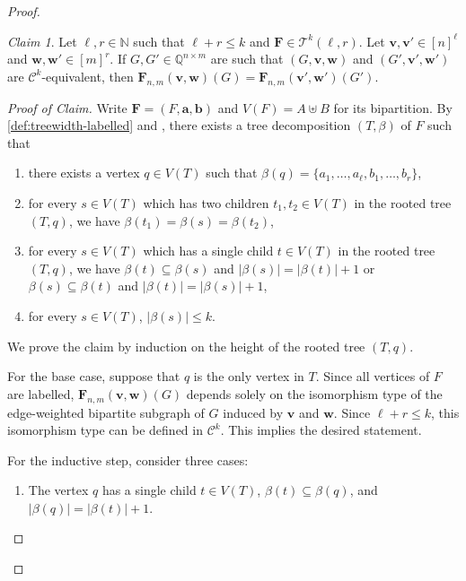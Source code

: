\documentclass[10pt,a4paper]{article}
\theoremstyle{definition}
\theoremstyle{plain}
\theoremstyle{remark}
\newtheorem{claim}{Claim}[definition]
\newenvironment{claimproof}[1][Proof of Claim]{\begin{proof}[#1] \renewcommand{\qedsymbol}{$\lrcorner$}}{ \end{proof}}
\begin{document}
\begin{proof}
		\begin{claim}
			Let $\ell, r \in \mathbb{N}$ such that $\ell +r \leq k$ and $\boldsymbol{F} \in \mathcal{T}^k(\ell, r)$.
			Let $\boldsymbol{v},\boldsymbol{v}' \in [n]^\ell$ and $\boldsymbol{w},\boldsymbol{w}' \in [m]^r$. 
			If $G, G' \in \mathbb{Q}^{n\times m}$ are such that $(G, \boldsymbol{v}, \boldsymbol{w})$ and $(G', \boldsymbol{v}', \boldsymbol{w}')$ are $\mathcal{C}^k$-equivalent,
			then $\boldsymbol{F}_{n,m}(\boldsymbol{v}, \boldsymbol{w})(G) = \boldsymbol{F}_{n,m}(\boldsymbol{v}', \boldsymbol{w}')(G')$.
		\end{claim}
		\begin{claimproof}
			Write $\boldsymbol{F} = (F, \boldsymbol{a}, \boldsymbol{b})$ and $V(F) = A \uplus B$ for its bipartition.
			By \cref{def:treewidth-labelled} and \cite[Lemma~7]{bodlaender_partial_1998},
			there exists a tree decomposition $(T, \beta)$ of $F$ such that
			\begin{enumerate}
				\item there exists a vertex $q \in V(T)$ such that $\beta(q)= \{a_1, \dots, a_\ell, b_1, \dots, b_r \}$,
				\item for every $s \in V(T)$ which has
                                  two children $t_1, t_2 \in V(T)$ in
                                  the rooted tree $(T, q)$, we have $\beta(t_1) = \beta(s) = \beta(t_2)$,
				\item for every $s \in V(T)$ which has
                                  a single child $t \in V(T)$ in the
                                  rooted tree $(T, q)$, we have $\beta(t) \subseteq \beta(s)$ and $|\beta(s)| = |\beta(t)|+1$ or  $\beta(s) \subseteq \beta(t)$ and $|\beta(t)| = |\beta(s)|+1$,
				\item for every $s \in V(T)$, $|\beta(s)| \leq k$.
			\end{enumerate}
			We prove the claim by induction on the height of the rooted tree $(T, q)$.
			
			For the base case, suppose that $q$ is the only vertex in $T$.
			Since all vertices of $F$ are labelled, 
			$\boldsymbol{F}_{n,m}(\boldsymbol{v}, \boldsymbol{w})(G)$ depends solely on the isomorphism type of the edge-weighted bipartite subgraph of $G$ induced by $\boldsymbol{v}$ and $\boldsymbol{w}$.
			Since $\ell + r \leq k$, this isomorphism type can be defined in $\mathcal{C}^k$.
			This implies the desired statement.
			
			For the inductive step, consider three cases:
			\begin{enumerate}
				\item The vertex $q$ has a single child $t \in V(T)$, $\beta(t) \subseteq \beta(q)$, and $|\beta(q)| = |\beta(t)|+1$.
				

\end{enumerate}
\end{claimproof}
\end{proof}
\end{document}
